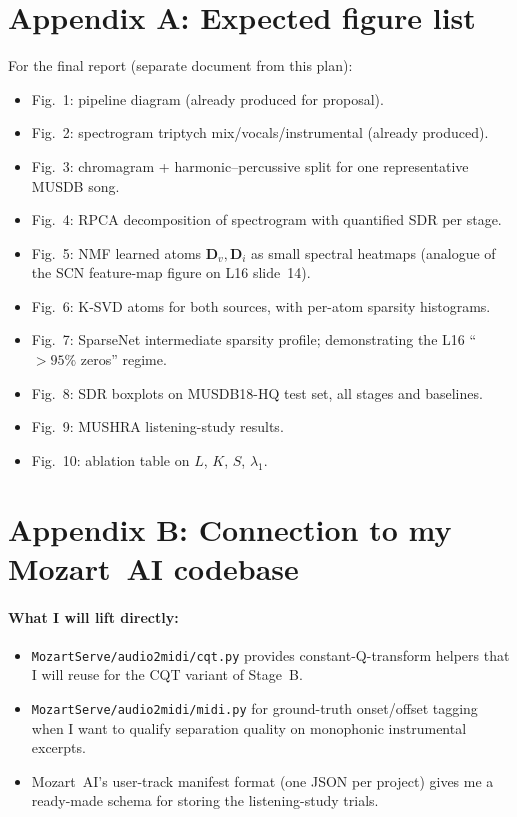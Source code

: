 \documentclass[10pt]{article}
\begin{document}
\section{Appendix A: Expected figure list}
For the final report (separate document from this plan):
\begin{itemize}
\item Fig.~1: pipeline diagram (already produced for proposal).
\item Fig.~2: spectrogram triptych mix/vocals/instrumental (already produced).
\item Fig.~3: chromagram + harmonic--percussive split for one
representative MUSDB song.
\item Fig.~4: RPCA decomposition of spectrogram with quantified
SDR per stage.
\item Fig.~5: NMF learned atoms $\bm{D}_v,\bm{D}_i$ as small spectral
heatmaps (analogue of the SCN feature-map figure on L16 slide~14).
\item Fig.~6: K-SVD atoms for both sources, with per-atom sparsity
histograms.
\item Fig.~7: SparseNet intermediate sparsity profile; demonstrating
the L16 ``$>\!95\%$ zeros'' regime.
\item Fig.~8: SDR boxplots on MUSDB18-HQ test set, all stages and
baselines.
\item Fig.~9: MUSHRA listening-study results.
\item Fig.~10: ablation table on $L$, $K$, $S$, $\lambda_1$.
\end{itemize}

\section{Appendix B: Connection to my Mozart~AI codebase}
\paragraph{What I will lift directly:}
\begin{itemize}
\item \texttt{MozartServe/audio2midi/cqt.py} provides constant-Q-transform
helpers that I will reuse for the CQT variant of Stage~B.
\item \texttt{MozartServe/audio2midi/midi.py} for ground-truth onset/offset
tagging when I want to qualify separation quality on monophonic
instrumental excerpts.
\item Mozart~AI's user-track manifest format (one JSON per project) gives
me a ready-made schema for storing the listening-study trials.
\end{itemize}
\end{document}
